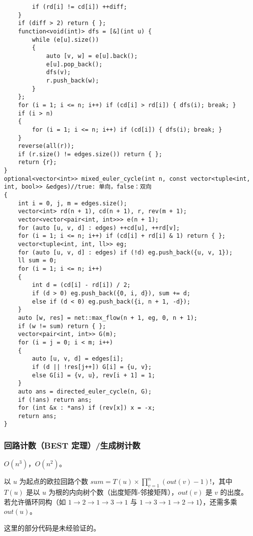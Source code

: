 \documentclass[12pt]{ctexart}
\begin{document}
\begin{lstlisting}
		if (rd[i] != cd[i]) ++diff;
	}
	if (diff > 2) return { };
	function<void(int)> dfs = [&](int u) {
		while (e[u].size())
		{
			auto [v, w] = e[u].back();
			e[u].pop_back();
			dfs(v);
			r.push_back(w);
		}
	};
	for (i = 1; i <= n; i++) if (cd[i] > rd[i]) { dfs(i); break; }
	if (i > n)
	{
		for (i = 1; i <= n; i++) if (cd[i]) { dfs(i); break; }
	}
	reverse(all(r));
	if (r.size() != edges.size()) return { };
	return {r};
}
optional<vector<int>> mixed_euler_cycle(int n, const vector<tuple<int, int, bool>> &edges)//true: 单向，false：双向
{
	int i = 0, j, m = edges.size();
	vector<int> rd(n + 1), cd(n + 1), r, rev(m + 1);
	vector<vector<pair<int, int>>> e(n + 1);
	for (auto [u, v, d] : edges) ++cd[u], ++rd[v];
	for (i = 1; i <= n; i++) if (cd[i] + rd[i] & 1) return { };
	vector<tuple<int, int, ll>> eg;
	for (auto [u, v, d] : edges) if (!d) eg.push_back({u, v, 1});
	ll sum = 0;
	for (i = 1; i <= n; i++)
	{
		int d = (cd[i] - rd[i]) / 2;
		if (d > 0) eg.push_back({0, i, d}), sum += d;
		else if (d < 0) eg.push_back({i, n + 1, -d});
	}
	auto [w, res] = net::max_flow(n + 1, eg, 0, n + 1);
	if (w != sum) return { };
	vector<pair<int, int>> G(m);
	for (i = j = 0; i < m; i++)
	{
		auto [u, v, d] = edges[i];
		if (d || !res[j++]) G[i] = {u, v};
		else G[i] = {v, u}, rev[i + 1] = 1;
	}
	auto ans = directed_euler_cycle(n, G);
	if (!ans) return ans;
	for (int &x : *ans) if (rev[x]) x = -x;
	return ans;
}
\end{lstlisting}

\subsubsection{回路计数（BEST 定理）/生成树计数}

$O(n^3)$，$O(n^2)$。

以 $u$ 为起点的欧拉回路个数 $sum=T(u)\times \prod\limits_{v=1}^n(out(v)-1)!$，其中 $T(u)$ 是以 $u$ 为根的内向树个数（出度矩阵-邻接矩阵），$out(v)$ 是 $v$ 的出度。若允许循环同构（如 $1\to 2\to 1\to 3\to 1$ 与 $1\to 3\to 1\to 2\to 1$），还需多乘 $out(u)$。

这里的部分代码是未经验证的。
\end{document}
